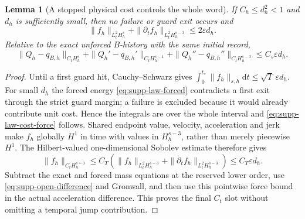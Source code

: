 \documentclass[11pt]{article}
\numberwithin{equation}{section}
\newtheorem{lemma}[lemma]{Lemma}
\theoremstyle{definition}
\theoremstyle{remark}
\newcommand{\dd}{\mathrm d}
\begin{document}
\begin{lemma}[A stopped physical cost controls the whole word]
\label{lem:supp-law-cost-control}
If $C_h\le d_h^2<1$ and $d_h$ is sufficiently small, then no failure or guard
exit occurs and
\begin{equation}
 \|f_h\|_{L_t^2H_h^s}+\|\partial_tf_h\|_{L_t^2H_h^{s-3}}
       \le2\varepsilon d_h.
 \label{eq:supp-law-cost-force}
\end{equation}
Relative to the exact unforced $B$-history with the same initial record,
\begin{equation}
 \|Q_h-q_{B,h}\|_{C_tH_h^s}
 +\|Q_h'-q_{B,h}'\|_{C_tH_h^{s-1}}
 +\|Q_h''-q_{B,h}''\|_{C_tH_h^{s-3}}
 \le C_s\varepsilon d_h.
 \label{eq:supp-law-cost-shadow}
\end{equation}
\end{lemma}
\begin{proof}
Until a first guard hit, Cauchy--Schwarz gives
$\int_0^{t_*}\|f_h\|_{s,h}\dd t\le\sqrt T\,\varepsilon d_h$.
For small $d_h$ the forced energy \eqref{eq:supp-law-forced} contradicts a
first exit through the strict guard margin; a failure is excluded because it
would already contribute unit cost.  Hence the integrals are over the whole
interval and \eqref{eq:supp-law-cost-force} follows. Shared endpoint
value, velocity, acceleration and jerk make $f_h$ globally $H^1$ in time
with values in $H_h^{s-3}$, rather than merely piecewise $H^1$. The
Hilbert-valued one-dimensional Sobolev estimate therefore gives
\[
 \|f_h\|_{C_tH_h^{s-3}}
 \le C_T(\|f_h\|_{L_t^2H_h^{s-3}}+
                         \|\partial_tf_h\|_{L_t^2H_h^{s-3}})
 \le C_T\varepsilon d_h.
\]
Subtract the exact and forced mass equations at the reserved lower order,
use \eqref{eq:supp-open-difference} and Gronwall, and then use this
pointwise force bound in the actual acceleration difference. This proves
the final $C_t$ slot without omitting a temporal jump contribution.
\end{proof}
\end{document}
